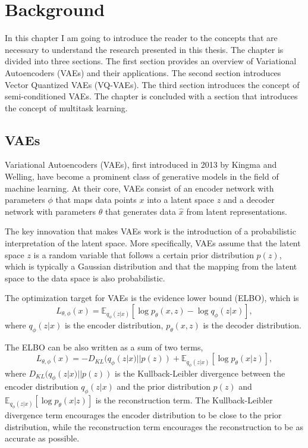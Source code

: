 \chapter{Background}

In this chapter I am going to introduce the reader to the concepts that are necessary to understand the research presented in this thesis. The chapter is divided into three sections. The first section provides an overview of Variational Autoencoders (VAEs) and their applications. The second section introduces Vector Quantized VAEs (VQ-VAEs). The third section introduces the concept of semi-conditioned VAEs. The chapter is concluded with a section that introduces the concept of multitask learning. 

\section{VAEs}

Variational Autoencoders (VAEs), first introduced in 2013 by Kingma and Welling\cite{kingma2013autoencoding}, have become a prominent class of generative models in the field of machine learning.  At their core, VAEs consist of an encoder network with parameters $\phi$ that maps data points $x$ into a latent space $z$ and a decoder network with parameters $\theta$ that generates data $\hat{x}$ from latent representations\cite{Kingma_2019}. 

The key innovation that makes VAEs work is the introduction of a probabilistic interpretation of the latent space. More specifically, VAEs assume that the latent space $z$ is a random variable that follows a certain prior distribution $p(z)$, which is typically a Gaussian distribution and that the mapping from the latent space to the data space is also probabilistic\cite{kingma2013autoencoding}.

The optimization target for VAEs is the evidence lower bound (ELBO), which is
 \[ L_{\theta, \phi}(x) = \mathbb{E}_{q_{\phi}(z|x)} [\log p_{\theta}(x, z) - \log q_{\phi}(z|x)], \]
where $q_{\phi}(z|x)$ is the encoder distribution, $p_{\theta}(x, z)$ is the decoder distribution. 

The ELBO can be also written as a sum of two terms,
 \[ L_{\theta, \phi}(x) = - D_{KL}(q_{\phi}(z|x) || p(z)) + \mathbb{E}_{q_{\phi}(z|x)} [\log p_{\theta}(x|z)], \]
 where $D_{KL}(q_{\phi}(z|x) || p(z))$ is the Kullback-Leibler divergence between the encoder distribution $q_{\phi}(z|x)$ and the prior distribution $p(z)$ and $\mathbb{E}_{q_{\phi}(z|x)} [\log p_{\theta}(x|z)]$ is the reconstruction term. The Kullback-Leibler divergence term encourages the encoder distribution to be close to the prior distribution, while the reconstruction term encourages the reconstruction to be as accurate as possible\cite{Kingma_2019}.


